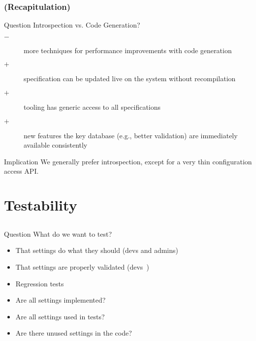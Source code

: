 \begin{frame}
	\frametitle{(Recapitulation)}
	\begin{alertblock}{Question}
	Introspection vs. Code Generation?
	\end{alertblock}

	\pause

	\pause
	\begin{description}
	\item[$-$] more techniques for performance improvements with code generation
	\item[$+$] specification can be updated live on the system without recompilation
	\item[$+$] tooling has generic access to all specifications
 	\item[$+$] new features the key database (e.g., better validation) are immediately available consistently
	\end{description}
	\vspace{1em}
	\begin{alertblock}{Implication}
	We generally prefer introspection, except for a very thin configuration access API.
	\end{alertblock}
\end{frame}


\section{Testability}


\subsection{}

\begin{frame}
	\begin{alertblock}{Question}
	What do we want to test?
	\end{alertblock}

	\pause
	\begin{itemize}
	\item That settings do what they should (devs and admins)
	\item That settings are properly validated (devs~\cite{xu2013blame})
	\item Regression tests~\cite{qu2008configuration}
	\pause
	\vspace{1em}
	\item Are all settings implemented?
	\item Are all settings used in tests?
	\item Are there unused settings in the code?
	\end{itemize}
\end{frame}

